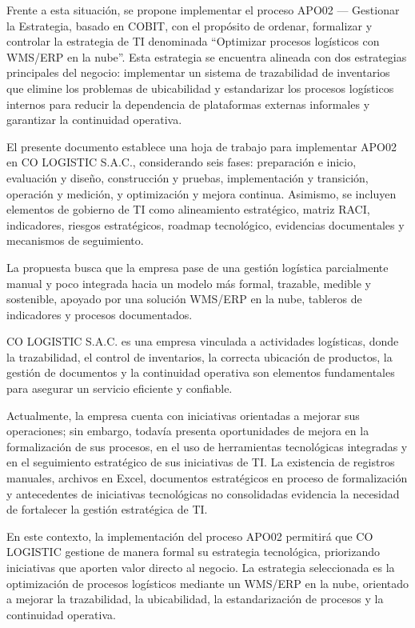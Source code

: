 \documentclass[11pt]{article}
\begin{document}
Frente a esta situación, se propone implementar el proceso APO02 --- Gestionar la Estrategia, basado en COBIT, con el propósito de ordenar, formalizar y controlar la estrategia de TI denominada ``Optimizar procesos logísticos con WMS/ERP en la nube''. Esta estrategia se encuentra alineada con dos estrategias principales del negocio: implementar un sistema de trazabilidad de inventarios que elimine los problemas de ubicabilidad y estandarizar los procesos logísticos internos para reducir la dependencia de plataformas externas informales y garantizar la continuidad operativa.

El presente documento establece una hoja de trabajo para implementar APO02 en CO LOGISTIC S.A.C., considerando seis fases: preparación e inicio, evaluación y diseño, construcción y pruebas, implementación y transición, operación y medición, y optimización y mejora continua. Asimismo, se incluyen elementos de gobierno de TI como alineamiento estratégico, matriz RACI, indicadores, riesgos estratégicos, roadmap tecnológico, evidencias documentales y mecanismos de seguimiento.

La propuesta busca que la empresa pase de una gestión logística parcialmente manual y poco integrada hacia un modelo más formal, trazable, medible y sostenible, apoyado por una solución WMS/ERP en la nube, tableros de indicadores y procesos documentados.

CO LOGISTIC S.A.C. es una empresa vinculada a actividades logísticas, donde la trazabilidad, el control de inventarios, la correcta ubicación de productos, la gestión de documentos y la continuidad operativa son elementos fundamentales para asegurar un servicio eficiente y confiable.

Actualmente, la empresa cuenta con iniciativas orientadas a mejorar sus operaciones; sin embargo, todavía presenta oportunidades de mejora en la formalización de sus procesos, en el uso de herramientas tecnológicas integradas y en el seguimiento estratégico de sus iniciativas de TI. La existencia de registros manuales, archivos en Excel, documentos estratégicos en proceso de formalización y antecedentes de iniciativas tecnológicas no consolidadas evidencia la necesidad de fortalecer la gestión estratégica de TI.

En este contexto, la implementación del proceso APO02 permitirá que CO LOGISTIC gestione de manera formal su estrategia tecnológica, priorizando iniciativas que aporten valor directo al negocio. La estrategia seleccionada es la optimización de procesos logísticos mediante un WMS/ERP en la nube, orientado a mejorar la trazabilidad, la ubicabilidad, la estandarización de procesos y la continuidad operativa.
\end{document}
